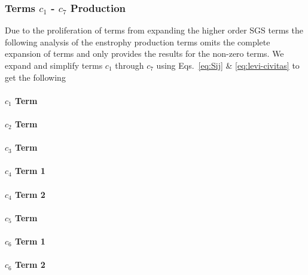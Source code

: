 \subsubsection{Terms $c_{1}$ - $c_{7}$ Production}
Due to the proliferation of terms from expanding the higher order SGS terms the following analysis
of the enstrophy production terms omits the complete expansion of terms and only provides the
results for the non-zero terms.  We expand and simplify terms $c_{1}$
through $c_{7}$ using Eqs.~\ref{eq:Sij} \&
\ref{eq:levi-civitas} to get the following
\paragraph{$c_{1}$ Term}

\paragraph{$c_{2}$ Term}

\paragraph{$c_{3}$ Term}

\paragraph{$c_{4}$ Term 1}

\paragraph{$c_{4}$ Term 2}

\paragraph{$c_{5}$ Term}

\paragraph{$c_{6}$ Term 1}

\paragraph{$c_{6}$ Term 2}

